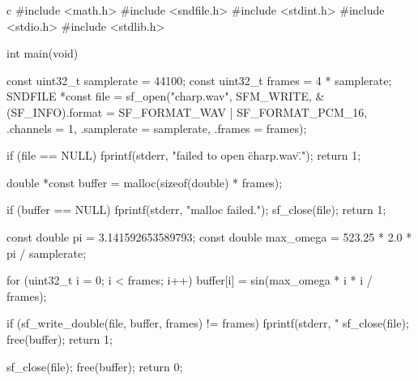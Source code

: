 \documentclass[../../main]{subfiles}
\begin{document}
\begin{codeblock}{c}
#include <math.h>
#include <sndfile.h>
#include <stdint.h>
#include <stdio.h>
#include <stdlib.h>

int main(void) {
  const uint32_t samplerate = 44100;
  const uint32_t frames = 4 * samplerate;
  SNDFILE *const file =
      sf_open("charp.wav", SFM_WRITE,
              &(SF_INFO){.format = SF_FORMAT_WAV | SF_FORMAT_PCM_16,
                          .channels = 1,
                          .samplerate = samplerate,
                          .frames = frames});

  if (file == NULL) {
    fprintf(stderr, "failed to open \"charp.wav\".\n");
    return 1;
  }

  double *const buffer = malloc(sizeof(double) * frames);

  if (buffer == NULL) {
    fprintf(stderr, "malloc failed.\n");
    sf_close(file);
    return 1;
  }

  const double pi = 3.141592653589793;
  const double max_omega = 523.25 * 2.0 * pi / samplerate;

  for (uint32_t i = 0; i < frames; i++) {
    buffer[i] = sin(max_omega * i * i / frames);
  }

  if (sf_write_double(file, buffer, frames) != frames) {
    fprintf(stderr, "%
    sf_close(file);
    free(buffer);
    return 1;
  }

  sf_close(file);
  free(buffer);
  return 0;
}
\end{codeblock}
\end{document}
